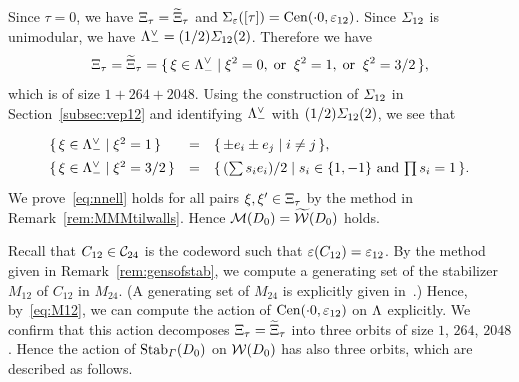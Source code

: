 \documentclass{amsart} %
\begin{document}
%
Since $\tau=0$,
we have $\Xi_{\tau}=\widetilde{\Xi}_{\tau}$ and $\Sigma_{\varepsilon}([\tau])=\mathrm{Cen}(\cdot 0, \varepsilon_{12})$.
Since $\varSigma_{12}$ is unimodular,
we have $\Lambda_{-}^{\vee}= (1/2)\varSigma_{12}(2)$.
Therefore we have 
\[
\Xi_{\tau}=\widetilde{\Xi}_{\tau}=\{\,{\xi\in \Lambda_{-}^{\vee}}\mid {\xi^2=0, \;\textrm{or}\; \; \xi^2=1, \;\textrm{or}\; \; \xi^2=3/2} \,\},
\]
which is of size $1+264+2048$.
Using the construction of $\varSigma_{12}$ in Section~\ref{subsec:vep12} and 
identifying $\Lambda_{-}^{\vee}$ with $ (1/2)\varSigma_{12}(2)$,
we see that 
\[
\renewcommand{\arraystretch}{1.4}
\begin{array}{lcl}
\set{\xi\in \Leechminus\dual}{\xi^2=1} &=& \set{\pm e_i\pm e_j}{i\ne j}, \\
\set{\xi\in \Leechminus\dual}{\xi^2=3/2} &=& \set{(\sum s_i e_i)/2}{\textrm{$s_i\in \{1, -1\}$ and $\prod s_i=1$}}. \\
\end{array}
\]
%
%
We prove~\eqref{eq:nnell} holds for all pairs $\xi, \xi^{\prime}\in \Xi_{\tau}$
by the method in Remark~\ref{rem:MMMtilwalls}.
Hence 
$\mathord{\mathcal{M}}(D_0)=\widetilde{\mathord{\mathcal{W}}}(D_0)$ holds.
%
\par 
%
Recall that $C_{12}\in \mathord{\mathcal{C}}_{24}$ is the codeword such that $\varepsilon(C_{12})=\varepsilon_{12}$. %
By the method given in Remark~\ref{rem:gensofstab}, 
we compute a generating set of 
the stabilizer $M_{12}$ of $C_{12}$ in $M_{24}$.
(A generating set of $M_{24}$ is explicitly given in~\cite[Chapter 10, Section 2]{theCSbook}.)
Hence, by~\eqref{eq:M12},
we can compute the action of $\mathrm{Cen}(\cdot 0, \varepsilon_{12})$ on $\Lambda$ explicitly.
We confirm that this action decomposes $\Xi_{\tau}=\widetilde{\Xi}_{\tau}$
into three orbits of size $1$, $264$, $2048$.
Hence the action of $\operatorname{Stab}_{\varGamma}(D_0)$ on $\mathord{\mathcal{W}}(D_0)$ 
has also three orbits,
which are described as follows.
%
\end{document}
